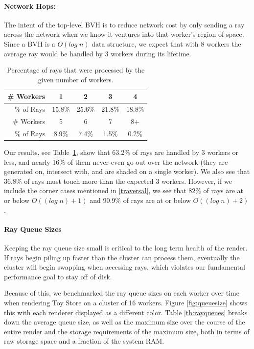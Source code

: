 \documentclass[a4paper,twoside]{article}
\begin{document}
\paragraph{Network Hops:}
The intent of the top-level BVH is to reduce network cost by only sending
a ray across the network when we know it ventures into that worker's region
of space. Since a BVH is a $O(log\;n)$ data structure, we expect that with 8
workers the average ray would be handled by 3 workers during its lifetime.

\begin{table}
\begin{center}
\begin{tabular}{|r||c|c|c|c|}
    \hline
    \# Workers& 1 & 2 & 3 & 4 \\

    \hline
    \% of Rays & 15.8\% & 25.6\% & 21.8\% & 18.8\%\\
\hline
        \hline
           \# Workers & 5 & 6 & 7 & 8+ \\
               \hline
                    \% of Rays    & 8.9\% & 7.4\% & 1.5\% & 0.2\% \\
    \hline
\end{tabular}
\caption{Percentage of rays that were processed by the given number of workers.}
\label{tb:nethopspercent}
\end{center}
\end{table}

Our results, see Table~\ref{tb:nethopspercent}, show that 63.2\% of rays are handled by 3 workers or less, and
nearly 16\% of them never even go out over the network (they are generated on,
intersect with, and are shaded on a single worker). We also see that 36.8\% of
rays must touch more than the expected 3 workers.  However, if we include the 
corner cases mentioned in \ref{traversal}, we see that
82\% of rays are at or below $O((log\;n) + 1)$ and 90.9\% of rays are at or
below $O((log\;n) + 2)$. 

\paragraph{Ray Queue Sizes}
Keeping the ray queue size small is critical to the long term health of the
render. If rays begin piling up faster than the cluster can process them,
eventually the cluster will begin swapping when accessing rays, which violates
our fundamental performance goal to stay off of disk.

Because of this, we benchmarked the ray queue sizes on each worker over time
when rendering Toy Store on a cluster of 16 workers. Figure \ref{fig:queuesize}
shows this with each renderer displayed as a different color. Table \ref{tb:rayqueues}
breaks down the average queue size, as well as the maximum size over the course
of the entire render and the storage requirements of the maximum size, both in
terms of raw storage space and a fraction of the system RAM.
\end{document}
